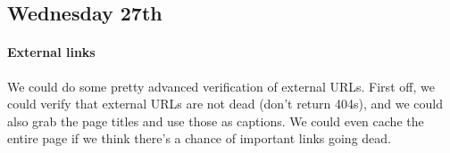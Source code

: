 \subsection{Wednesday 27th}
\paragraph{External links} We could do some pretty advanced verification of
external URLs. First off, we could verify that external URLs are not dead (don't
return 404s), and we could also grab the page titles and use those as
captions. We could even cache the entire page if we think there's a chance of
important links going dead.
